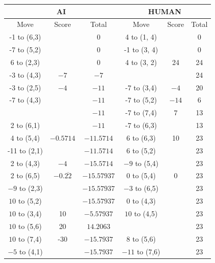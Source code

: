 \begin{appendices}
\begin{table}[H]
    \centering
    \begin{tabular}{cccccc}
        \hline
        \multicolumn{3}{c}{AI}        & \multicolumn{3}{c}{HUMAN}     \\ \hline
        Move         & Score & Total & Move          & Score & Total \\ \hline
          -1 to (6,3) &      &  0    &   4 to (1, 4) &      &  0    \\ \hline
          -7 to (5,2) &      &  0    &   -1 to (3, 4) &      &  0    \\ \hline
          6 to (2,3) &       &  0    &   4 to (3, 2) &  24   &  24    \\ \hline
          -3 to (4,3) & $-7$ &  $-7$ &               &       &  24    \\ \hline
          -3 to (2,5) & $-4$ &  $-11$ &  -7 to (3,4) & $-4$ &  20    \\ \hline
          -7 to (4,3) &      &  $-11$ &  -7 to (5,2) & $-14$ &  6    \\ \hline
                      &      &  $-11$ &  -7 to (7,4) & $7$   &  13    \\ \hline
          2 to (6,1)  &      &  $-11$ &  -7 to (6,3) &       &  13    \\ \hline
          4 to (5,4)  & $-0.5714$  &  $-11.5714$ &  6 to (6,3) & 10       &  23    \\ \hline
          -11 to (2,1)  &          &  $-11.5714$ &  6 to (5,2) &          &  23    \\ \hline
          2 to (4,3)  & $-4$       &  $-15.5714$ &  $-9$ to (5,4) &          &  23    \\ \hline
          2 to (6,5)  & $-0.\overline{22}$    &  $-15.57937$ &  $0$ to (5,4) &  0 &  23    \\ \hline
          $-9$ to (2,3)  &    &  $-15.57937$ &  $-3$ to (6,5) &    &  23    \\ \hline
          $10$ to (5,2)  &    &  $-15.57937$ &  $0$ to (4,3) &    &  23    \\ \hline
          $10$ to (3,4)  & 10    &  $-5.57937$ &  $10$ to (4,5) &    &  23    \\ \hline
          $10$ to (5,6)  & 20    &  $14.2063$ &                 &    &  23    \\ \hline
          $10$ to (7,4)  & -30    &  $-15.7937$ & 8 to (5,6)    &    &  23    \\ \hline
          $-5$ to (4,1)  &        &  $-15.7937$ & $-11$ to (7,6) &    &  23    \\ \hline

\end{tabular}
\end{table}
\end{appendices}
